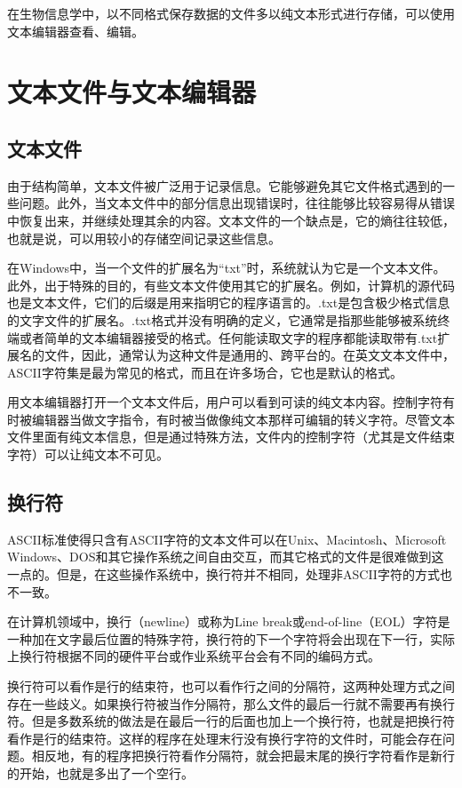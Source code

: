 \documentclass[11pt,a4paper,twoside]{book}
\begin{document}
在生物信息学中，以不同格式保存数据的文件多以纯文本形式进行存储，可以使用文本编辑器查看、编辑。

\section{文本文件与文本编辑器}
\subsection{文本文件}
由于结构简单，文本文件被广泛用于记录信息。它能够避免其它文件格式遇到的一些问题。此外，当文本文件中的部分信息出现错误时，往往能够比较容易得从错误中恢复出来，并继续处理其余的内容。文本文件的一个缺点是，它的熵往往较低，也就是说，可以用较小的存储空间记录这些信息。

在Windows中，当一个文件的扩展名为“txt”时，系统就认为它是一个文本文件。此外，出于特殊的目的，有些文本文件使用其它的扩展名。例如，计算机的源代码也是文本文件，它们的后缀是用来指明它的程序语言的。.txt是包含极少格式信息的文字文件的扩展名。.txt格式并没有明确的定义，它通常是指那些能够被系统终端或者简单的文本编辑器接受的格式。任何能读取文字的程序都能读取带有.txt扩展名的文件，因此，通常认为这种文件是通用的、跨平台的。在英文文本文件中，ASCII字符集是最为常见的格式，而且在许多场合，它也是默认的格式。

用文本编辑器打开一个文本文件后，用户可以看到可读的纯文本内容。控制字符有时被编辑器当做文字指令，有时被当做像纯文本那样可编辑的转义字符。尽管文本文件里面有纯文本信息，但是通过特殊方法，文件内的控制字符（尤其是文件结束字符）可以让纯文本不可见。

\subsection{换行符}
ASCII标准使得只含有ASCII字符的文本文件可以在Unix、Macintosh、Microsoft Windows、DOS和其它操作系统之间自由交互，而其它格式的文件是很难做到这一点的。但是，在这些操作系统中，换行符并不相同，处理非ASCII字符的方式也不一致。

在计算机领域中，换行（newline）或称为Line break或end-of-line（EOL）字符是一种加在文字最后位置的特殊字符，换行符的下一个字符将会出现在下一行，实际上换行符根据不同的硬件平台或作业系统平台会有不同的编码方式。

换行符可以看作是行的结束符，也可以看作行之间的分隔符，这两种处理方式之间存在一些歧义。如果换行符被当作分隔符，那么文件的最后一行就不需要再有换行符。但是多数系统的做法是在最后一行的后面也加上一个换行符，也就是把换行符看作是行的结束符。这样的程序在处理末行没有换行字符的文件时，可能会存在问题。相反地，有的程序把换行符看作分隔符，就会把最末尾的换行字符看作是新行的开始，也就是多出了一个空行。
\end{document}
